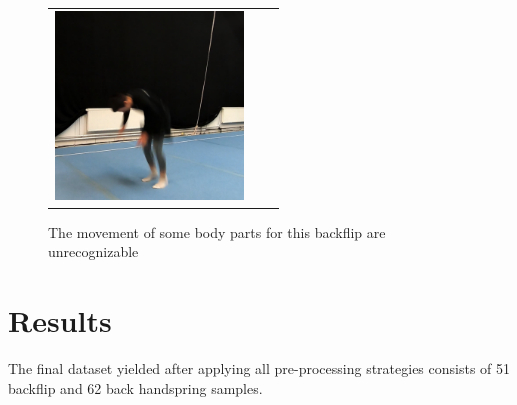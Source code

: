 \begin{figure}
\begin{tabular}{ccc}
\includegraphics[width=5cm]{images/data-preprocessing/unrec-backflip-part-6}\\
\end{tabular}
    \caption{The movement of some body parts for this backflip are unrecognizable}
    \label{example-of-unrecognizable-backflip}
\end{figure}

\section{Results}
\label{pre-processing-results}

The final dataset yielded after applying all pre-processing strategies consists of 51 backflip and 62 back handspring samples. 

